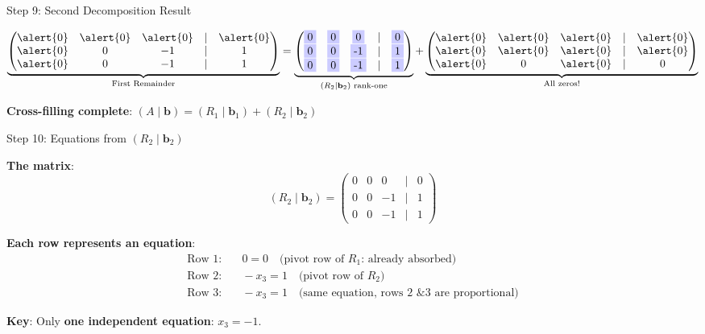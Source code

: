 \documentclass[10pt]{beamer}
\theoremstyle{definition}
\newcommand{\x}[1]{\alert{\textbf{#1}}}
\begin{document}
\begin{frame}[fragile]{Step 9: Second Decomposition Result}

$$\underbrace{\begin{pmatrix}
\alert{0} & \alert{0} & \alert{0} & | & \alert{0} \\
\alert{0} & 0 & -1 & | & 1 \\
\alert{0} & 0 & -1 & | & 1
\end{pmatrix}}_{\text{First Remainder}} = \underbrace{\begin{pmatrix}
\colorbox{blue!20}{0} & \colorbox{blue!20}{0} & \colorbox{blue!20}{0} & | & \colorbox{blue!20}{0} \\
\colorbox{blue!20}{0} & \colorbox{blue!20}{0} & \colorbox{blue!20}{-1} & | & \colorbox{blue!20}{1} \\
\colorbox{blue!20}{0} & \colorbox{blue!20}{0} & \colorbox{blue!20}{-1} & | & \colorbox{blue!20}{1}
\end{pmatrix}}_{(R_2 \mid \mathbf{b}_2) \text{ rank-one}} + \underbrace{\begin{pmatrix}
\alert{0} & \alert{0} & \alert{0} & | & \alert{0} \\
\alert{0} & \alert{0} & \alert{0} & | & \alert{0} \\
\alert{0} & 0 & \alert{0} & | & 0
\end{pmatrix}}_{\text{All zeros!}}$$

\vspace{1em}

\x{Cross-filling complete}: $(A \mid \mathbf{b}) = (R_1 \mid \mathbf{b}_1) + (R_2 \mid \mathbf{b}_2)$

\end{frame}

\begin{frame}{Step 10: Equations from $(R_2 \mid \mathbf{b}_2)$}

\x{The matrix}:
$$(R_2 \mid \mathbf{b}_2) = \begin{pmatrix}
0 & 0 & 0 & | & 0 \\
0 & 0 & -1 & | & 1 \\
0 & 0 & -1 & | & 1
\end{pmatrix}$$

\vspace{0.5em}

\x{Each row represents an equation}:
\begin{align*}
\text{Row 1}: &\quad 0 = 0 \quad \text{(pivot row of $R_1$: already absorbed)} \\
\text{Row 2}: &\quad -x_3 = 1 \quad \text{(pivot row of $R_2$)} \\
\text{Row 3}: &\quad -x_3 = 1 \quad \text{(same equation, rows 2 \& 3 are proportional)}
\end{align*}

\x{Key}: Only \x{one independent equation}: $x_3 = -1$.

\end{frame}
\end{document}
